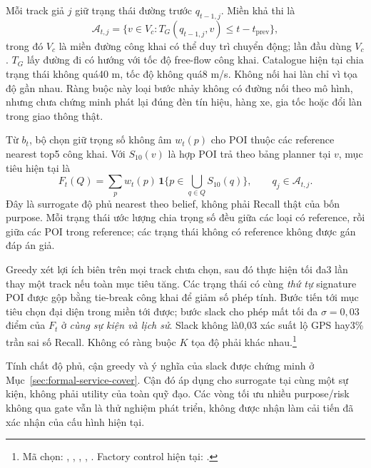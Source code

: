 Mỗi track giả $j$ giữ trạng thái đường trước $q_{t-1,j}$. Miền khả thi là
\begin{equation}
 \mathcal A_{t,j}=\{v\in V_c:T_G(q_{t-1,j},v)\leq t-t_{\mathrm{prev}}\},
 \label{eq:current-feasible}
\end{equation}
trong đó $V_c$ là miền đường công khai có thể duy trì chuyển động; lần đầu dùng $V_c$. $T_G$ lấy đường đi có hướng với tốc độ free-flow công khai. Catalogue hiện tại chia trạng thái không quá40 m, tốc độ không quá8 m/s. Không nối hai làn chỉ vì tọa độ gần nhau. Ràng buộc này loại bước nhảy không có đường nối theo mô hình, nhưng chưa chứng minh phát lại đúng đèn tín hiệu, hàng xe, gia tốc hoặc đổi làn trong giao thông thật.

Từ $b_t$, bộ chọn giữ trọng số không âm $w_t(p)$ cho POI thuộc các reference nearest top5 công khai. Với $S_{10}(v)$ là hợp POI trả theo bảng planner tại $v$, mục tiêu hiện tại là
\begin{equation}
 F_t(Q)=\sum_p w_t(p)\,\mathbf1\{p\in\bigcup_{q\in Q}S_{10}(q)\},
 \qquad q_j\in\mathcal A_{t,j}.
 \label{eq:current-cover}
\end{equation}
Đây là surrogate độ phủ nearest theo belief, không phải Recall thật của bốn purpose. Mỗi trạng thái ước lượng chia trọng số đều giữa các loại có reference, rồi giữa các POI trong reference; các trạng thái không có reference không được gán đáp án giả.

Greedy xét lợi ích biên trên mọi track chưa chọn, sau đó thực hiện tối đa3 lần thay một track nếu toàn mục tiêu tăng. Các trạng thái có cùng \emph{thứ tự} signature POI được gộp bằng tie-break công khai để giảm số phép tính. Bước tiến tới mục tiêu chọn đại diện trong miền tới được; bước slack cho phép mất tối đa $\sigma=0{,}03$ điểm của $F_t$ ở \emph{cùng sự kiện và lịch sử}. Slack không là0,03 xác suất lộ GPS hay3\% trần sai số Recall. Không có ràng buộc $K$ tọa độ phải khác nhau.\footnote{Mã chọn: , , , , . Factory control hiện tại: .}

Tính chất độ phủ, cận greedy và ý nghĩa của slack được chứng minh ở Mục~\ref{sec:formal-service-cover}. Cận đó áp dụng cho surrogate tại cùng một sự kiện, không phải utility của toàn quỹ đạo. Các vòng tối ưu nhiều purpose/risk không qua gate vẫn là thử nghiệm phát triển, không được nhận làm cải tiến đã xác nhận của cấu hình hiện tại.

